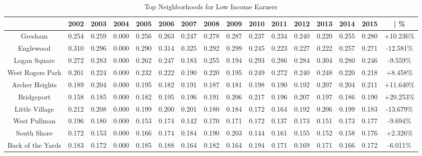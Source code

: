 \documentclass{article}
\theoremstyle{definition}
\theoremstyle{remark}
\begin{document}
\begin{table}[h]\centering
\caption{Top Neighborhoods for Low Income Earners}\label{thelabel}
\begin{adjustbox}{center}
\begin{tabular}{||c | c c c c c c c c c c c c c c | c ||} 
 \hline
 & 2002 & 2003 & 2004 & 2005 & 2006 & 2007 & 2008 & 2009 & 2010 & 2011 & 2012 & 2013 & 2014 & 2015 & | \%\\[0.5ex] 
 \hline\hline
Gresham           & 0.254 & 0.259 & 0.000 & 0.256 & 0.263 & 0.247 & 0.278 & 0.287 & 0.237 & 0.234 & 0.240 & 0.220 & 0.255 & 0.280 & +10.236\% \\
Englewood         & 0.310 & 0.296 & 0.000 & 0.290 & 0.314 & 0.325 & 0.292 & 0.299 & 0.245 & 0.223 & 0.227 & 0.222 & 0.257 & 0.271 & -12.581\% \\
Logan Square      & 0.272 & 0.283 & 0.000 & 0.262 & 0.247 & 0.183 & 0.255 & 0.194 & 0.293 & 0.286 & 0.284 & 0.304 & 0.280 & 0.246 & -9.559\% \\
West Rogers Park  & 0.201 & 0.224 & 0.000 & 0.232 & 0.222 & 0.190 & 0.220 & 0.195 & 0.249 & 0.272 & 0.240 & 0.248 & 0.220 & 0.218 & +8.458\% \\
Archer Heights    & 0.189 & 0.204 & 0.000 & 0.195 & 0.182 & 0.191 & 0.187 & 0.181 & 0.198 & 0.190 & 0.192 & 0.207 & 0.204 & 0.211 & +11.640\% \\
Bridgeport        & 0.158 & 0.185 & 0.000 & 0.182 & 0.195 & 0.196 & 0.191 & 0.206 & 0.217 & 0.196 & 0.207 & 0.197 & 0.186 & 0.190 & +20.253\% \\
Little Village    & 0.212 & 0.208 & 0.000 & 0.199 & 0.200 & 0.201 & 0.180 & 0.184 & 0.172 & 0.164 & 0.192 & 0.206 & 0.199 & 0.183 & -13.679\% \\
West Pullman      & 0.196 & 0.180 & 0.000 & 0.153 & 0.174 & 0.142 & 0.170 & 0.171 & 0.172 & 0.137 & 0.173 & 0.151 & 0.173 & 0.177 & -9.694\% \\
South Shore       & 0.172 & 0.153 & 0.000 & 0.166 & 0.174 & 0.184 & 0.190 & 0.203 & 0.144 & 0.161 & 0.155 & 0.152 & 0.158 & 0.176 & +2.326\% \\
Back of the Yards & 0.183 & 0.172 & 0.000 & 0.185 & 0.188 & 0.164 & 0.182 & 0.164 & 0.194 & 0.171 & 0.169 & 0.171 & 0.166 & 0.172 & -6.011\% \\
 \hline
 \end{tabular}
\end{adjustbox}
\end{table}
\end{document}
